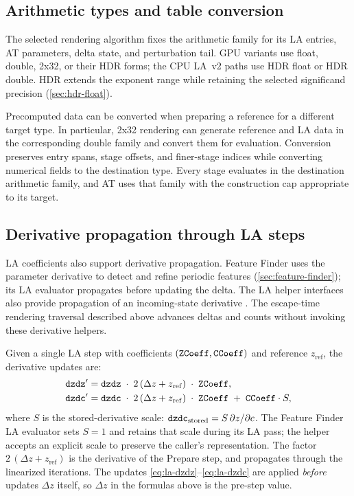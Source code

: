 \subsection{Arithmetic types and table conversion}
\label{sec:la-dp-conversion}

The selected rendering algorithm fixes the arithmetic family for its
LA entries, AT parameters, delta state, and perturbation tail. GPU
variants use float, double, 2x32, or their HDR forms; the CPU LA~v2
paths use HDR float or HDR double. HDR extends the exponent range
while retaining the selected significand precision
(\cref{sec:hdr-float}).

Precomputed data can be converted when preparing a reference for a
different target type. In particular, 2x32 rendering can generate
reference and LA data in the corresponding double family and convert
them for evaluation. Conversion preserves entry spans, stage offsets,
and finer-stage indices while converting numerical fields to the
destination type. Every stage evaluates in the destination arithmetic
family, and AT uses that family with the construction cap appropriate
to its target.

\subsection{Derivative propagation through LA steps}
\label{sec:la-derivatives}

LA coefficients also support derivative propagation. Feature Finder
uses the parameter derivative to detect and refine periodic features
(\cref{sec:feature-finder}); its LA evaluator propagates
 before updating the delta. The LA helper interfaces also
provide propagation of an incoming-state derivative .
The escape-time rendering traversal described above advances deltas
and counts without invoking these derivative helpers.

Given a single LA step with coefficients
\((\texttt{ZCoeff}, \texttt{CCoeff})\) and reference \(z_\mathrm{ref}\), the
derivative updates are:
\begin{align}
\texttt{dzdz}' &= \texttt{dzdz}
  \;\cdot\; 2\,(\Delta z + z_\mathrm{ref})
  \;\cdot\; \texttt{ZCoeff},
\label{eq:la-dzdz}
\\
\texttt{dzdc}' &= \texttt{dzdc}
  \;\cdot\; 2\,(\Delta z + z_\mathrm{ref})
  \;\cdot\; \texttt{ZCoeff}
  \;+\; \texttt{CCoeff} \cdot S,
\label{eq:la-dzdc}
\end{align}
where $S$ is the stored-derivative scale:
$\texttt{dzdc}_{\mathrm{stored}}=S\,\partial z/\partial c$.
The Feature Finder LA evaluator sets $S=1$ and retains that scale
during its LA pass; the helper accepts an explicit scale to preserve
the caller's representation.
The factor \(2\,(\Delta z + z_\mathrm{ref})\) is the derivative of the
Prepare step, and  propagates through the linearized
iterations.  The updates \eqref{eq:la-dzdz}--\eqref{eq:la-dzdc} are applied \emph{before}
 updates \(\Delta z\) itself, so \(\Delta z\) in the
formulas above is the pre-step value.

